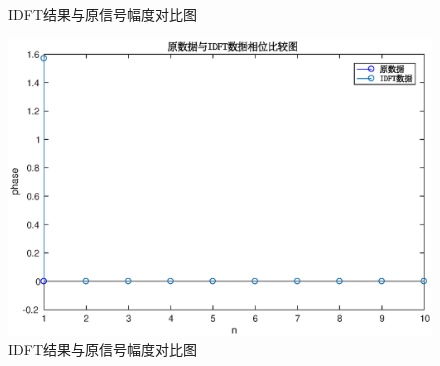 \documentclass[UTF8]{article}
\begin{document}
\begin{CJK}{UTF8}{gkai}
\begin{figure}
  \caption{IDFT结果与原信号幅度对比图}
  \label{pro1_fig2}
\end{figure}
\begin{figure}
  \centering
  \includegraphics[scale=0.5]{pro1_subpro2_phase.eps}
  \caption{IDFT结果与原信号幅度对比图}
  \label{pro1_fig3}
\end{figure}

\end{CJK}
\end{document}

